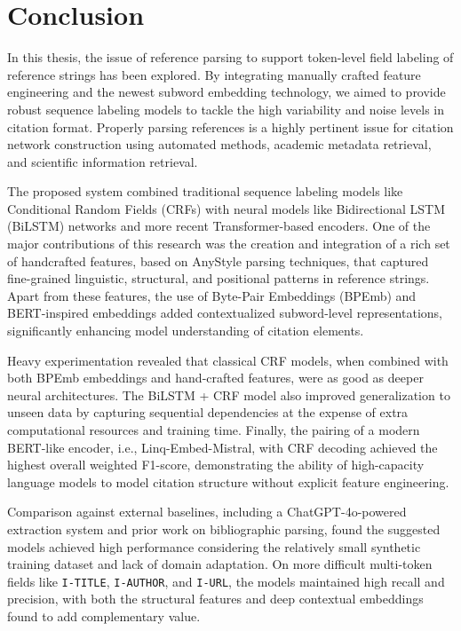 \chapter{Conclusion}
\label{ch:conclusion}
In this thesis, the issue of reference parsing to support token-level field labeling of reference strings has been explored. By integrating manually crafted feature engineering and the newest subword embedding technology, we aimed to provide robust sequence labeling models to tackle the high variability and noise levels in citation format. Properly parsing references is a highly pertinent issue for citation network construction using automated methods, academic metadata retrieval, and scientific information retrieval.

The proposed system combined traditional sequence labeling models like Conditional Random Fields (CRFs) with neural models like Bidirectional LSTM (BiLSTM) networks and more recent Transformer-based encoders. One of the major contributions of this research was the creation and integration of a rich set of handcrafted features, based on AnyStyle parsing techniques, that captured fine-grained linguistic, structural, and positional patterns in reference strings. Apart from these features, the use of Byte-Pair Embeddings (BPEmb) and BERT-inspired embeddings added contextualized subword-level representations, significantly enhancing model understanding of citation elements.

Heavy experimentation revealed that classical CRF models, when combined with both BPEmb embeddings and hand-crafted features, were as good as deeper neural architectures. The BiLSTM + CRF model also improved generalization to unseen data by capturing sequential dependencies at the expense of extra computational resources and training time. Finally, the pairing of a modern BERT-like encoder, i.e., Linq-Embed-Mistral, with CRF decoding achieved the highest overall weighted F1-score, demonstrating the ability of high-capacity language models to model citation structure without explicit feature engineering.

Comparison against external baselines, including a ChatGPT-4o-powered extraction system and prior work on bibliographic parsing, found the suggested models achieved high performance considering the relatively small synthetic training dataset and lack of domain adaptation. On more difficult multi-token fields like \texttt{I-TITLE}, \texttt{I-AUTHOR}, and \texttt{I-URL}, the models maintained high recall and precision, with both the structural features and deep contextual embeddings found to add complementary value.

